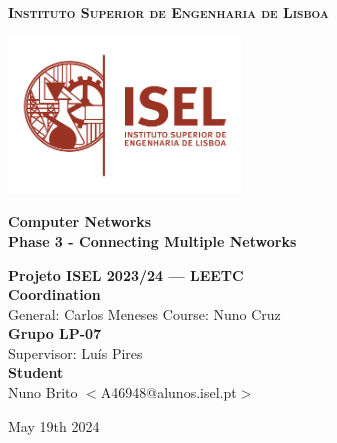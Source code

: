 \documentclass[11pt,a4paper]{report}
\newcommand{\school}{Instituto Superior de Engenharia de Lisboa}
\newcommand{\projisel}{Projeto ISEL 2023/24 --- LEETC}
\newcommand{\projtitle}{Computer Networks}
\newcommand{\projsubtitle}{Phase 3 - Connecting Multiple Networks}
\newcommand{\projteam}{Grupo LP-07}
\begin{document}
    \setcounter{page}{1}

\begin{titlepage}
    \center

    \vspace*{-12mm}
    {\large \textbf{\textsc{\school}}}\\

    \vfill

    \includegraphics[width=62mm]{logoisel}
    
    \vfill
    
    {\huge \textbf{\projtitle}}\\[6mm]
    {\Large \textbf{\projsubtitle}}\\
    
    \vfill
    
    \vfill
    
    {\Large \textbf{\projisel}}\\[12mm]
    
    {\Large \textbf{Coordination}}\\[4mm]
    {\large General: Carlos Meneses\hspace*{18mm}
            Course: Nuno Cruz}\\[6mm]
    
    {\Large \textbf{\projteam}}\\[4mm]
    {\large Supervisor: Luís Pires\hspace*{12mm}}\\[6mm]
    
    {\Large \textbf{Student}}\\[4mm]
    {\large Nuno Brito $<$A46948@alunos.isel.pt$>$}
    
    \vspace*{10mm}
    
    \renewcommand{\today}{May 19th 2024}
    \today
    
\end{titlepage}

\tableofcontents
\end{document}
